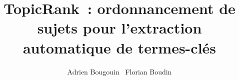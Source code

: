 \documentclass[utf8]{article-hermes}
\title[TopicRank]{TopicRank~: ordonnancement de sujets pour l'extraction
                  automatique de termes-clés}
\author{Adrien Bougouin\fup{*} \andauthor\ Florian Boudin\fup{*}}
\begin{document}
\maketitlepage



%






\end{document}
